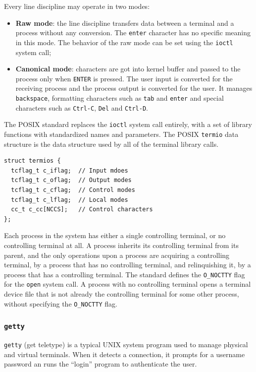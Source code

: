 Every line discipline may operate in two modes:
\begin{itemize}
\item \textbf{Raw mode}: the line discipline transfers data between a terminal and a process without any conversion. The \texttt{enter} character has no specific meaning in this mode. The behavior of the raw mode can be set using the \texttt{ioctl} system call;
\item \textbf{Canonical mode}: characters are got into kernel buffer and passed to the process only when \texttt{ENTER} is pressed. The user input is converted for the receiving process and the process output is converted for the user. It manages \texttt{backspace}, formatting characters such as \texttt{tab} and \texttt{enter} and special characters such as \texttt{Ctrl-C}, \texttt{Del} and \texttt{Ctrl-D}.
\end{itemize}

The POSIX standard replaces the \texttt{ioctl} system call entirely, with a set of library functions with standardized names and parameters. The POSIX \texttt{termio} data structure is the data structure used by all of the terminal library calls.
\begin{verbatim}
struct termios {
  tcflag_t c_iflag;  // Input mdoes
  tcflag_t c_oflag;  // Output modes
  tcflag_t c_cflag;  // Control modes
  tcflag_t c_lflag;  // Local modes
  cc_t c_cc[NCCS];   // Control characters
};
\end{verbatim}
Each process in the system has either a single controlling terminal, or no controlling terminal at all. A process inherits its controlling terminal from its parent, and the only operations upon a process are acquiring a controlling terminal, by a process that has no controlling terminal, and relinquishing it, by a process that has a controlling terminal. The standard defines the \texttt{O\_NOCTTY} flag for the \texttt{open} system call. A process with no controlling terminal opens a terminal device file that is not already the controlling terminal for some other process, without specifying the \texttt{O\_NOCTTY} flag.

\subsubsection{\texttt{getty}}
\texttt{getty} (get teletype) is a typical UNIX system program used to manage physical and virtual terminals. When it detects a connection, it prompts for a username password an runs the ``login'' program to authenticate the user.


